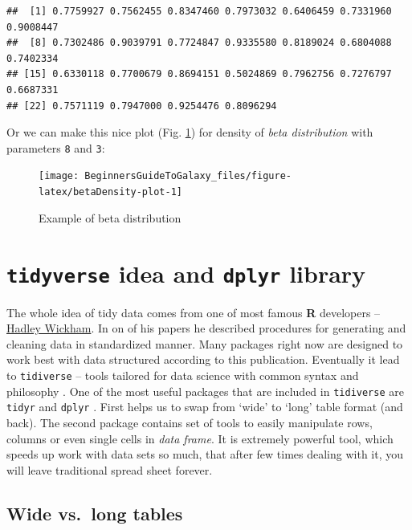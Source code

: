 \documentclass[]{book}
\theoremstyle{definition}
\theoremstyle{definition}
\theoremstyle{definition}
\theoremstyle{remark}
\begin{document}
\begin{verbatim}
##  [1] 0.7759927 0.7562455 0.8347460 0.7973032 0.6406459 0.7331960 0.9008447
##  [8] 0.7302486 0.9039791 0.7724847 0.9335580 0.8189024 0.6804088 0.7402334
## [15] 0.6330118 0.7700679 0.8694151 0.5024869 0.7962756 0.7276797 0.6687331
## [22] 0.7571119 0.7947000 0.9254476 0.8096294
\end{verbatim}

Or we can make this nice plot (Fig. \ref{fig:betaDensity-plot}) for
density of \emph{beta distribution} with parameters \texttt{8} and
\texttt{3}:

\begin{figure}

{\centering \texttt{[image: BeginnersGuideToGalaxy\_files/figure-latex/betaDensity-plot-1]} 

}

\caption{Example of beta distribution}\label{fig:betaDensity-plot}
\end{figure}

\section{\texorpdfstring{\texttt{tidyverse} idea and \texttt{dplyr}
library}{tidyverse idea and dplyr library}}\label{tidyverse-idea-and-dplyr-library}

The whole idea of tidy data comes from one of most famous \textbf{R}
developers -- \href{http://hadley.nz/}{Hadley Wickham}. In on of his
papers \citep{hadley2014} he described procedures for generating and
cleaning data in standardized manner. Many packages right now are
designed to work best with data structured according to this
publication. Eventually it lead to \texttt{tidiverse} -- tools tailored
for data science with common syntax and philosophy \citep{R-tidyverse}.
One of the most useful packages that are included in \texttt{tidiverse}
\citep{R-tidyverse} are \texttt{tidyr} \citep{R-tidyr} and
\texttt{dplyr} \citep{R-dplyr}. First helps us to swap from `wide' to
`long' table format (and back). The second package contains set of tools
to easily manipulate rows, columns or even single cells in \emph{data
frame}. It is extremely powerful tool, which speeds up work with data
sets so much, that after few times dealing with it, you will leave
traditional spread sheet forever.

\subsection{Wide vs.~long tables}\label{wide-vs.long-tables}
\end{document}
